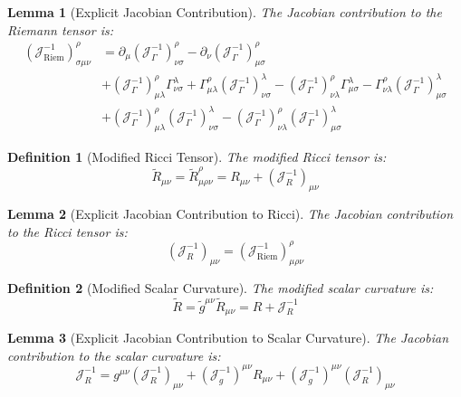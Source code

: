 \documentclass{article}
\newcommand{\tl}[1]{\tilde{#1}}
\newtheorem{lemma}{Lemma}
\newtheorem{definition}{Definition}
\begin{document}
\begin{lemma}[Explicit Jacobian Contribution]
The Jacobian contribution to the Riemann tensor is:
\begin{align}
(\mathcal{J}^{-1}_{\text{Riem}})^{\rho}_{\sigma\mu\nu} &= \partial_{\mu}(\mathcal{J}^{-1}_{\Gamma})^{\rho}_{\nu\sigma} - \partial_{\nu}(\mathcal{J}^{-1}_{\Gamma})^{\rho}_{\mu\sigma} \\
&+ (\mathcal{J}^{-1}_{\Gamma})^{\rho}_{\mu\lambda}\Gamma^{\lambda}_{\nu\sigma} + \Gamma^{\rho}_{\mu\lambda}(\mathcal{J}^{-1}_{\Gamma})^{\lambda}_{\nu\sigma} - (\mathcal{J}^{-1}_{\Gamma})^{\rho}_{\nu\lambda}\Gamma^{\lambda}_{\mu\sigma} - \Gamma^{\rho}_{\nu\lambda}(\mathcal{J}^{-1}_{\Gamma})^{\lambda}_{\mu\sigma} \\
&+ (\mathcal{J}^{-1}_{\Gamma})^{\rho}_{\mu\lambda}(\mathcal{J}^{-1}_{\Gamma})^{\lambda}_{\nu\sigma} - (\mathcal{J}^{-1}_{\Gamma})^{\rho}_{\nu\lambda}(\mathcal{J}^{-1}_{\Gamma})^{\lambda}_{\mu\sigma}
\end{align}
\end{lemma}

\begin{definition}[Modified Ricci Tensor]
The modified Ricci tensor is:
\begin{equation}
\tl{R}_{\mu\nu} = \tl{R}^{\rho}_{\mu\rho\nu} = R_{\mu\nu} + (\mathcal{J}^{-1}_R)_{\mu\nu}
\end{equation}
\end{definition}

\begin{lemma}[Explicit Jacobian Contribution to Ricci]
The Jacobian contribution to the Ricci tensor is:
\begin{equation}
(\mathcal{J}^{-1}_R)_{\mu\nu} = (\mathcal{J}^{-1}_{\text{Riem}})^{\rho}_{\mu\rho\nu}
\end{equation}
\end{lemma}

\begin{definition}[Modified Scalar Curvature]
The modified scalar curvature is:
\begin{equation}
\tl{R} = \tl{g}^{\mu\nu}\tl{R}_{\mu\nu} = R + \mathcal{J}^{-1}_R
\end{equation}
\end{definition}

\begin{lemma}[Explicit Jacobian Contribution to Scalar Curvature]
The Jacobian contribution to the scalar curvature is:
\begin{equation}
\mathcal{J}^{-1}_R = g^{\mu\nu}(\mathcal{J}^{-1}_R)_{\mu\nu} + (\mathcal{J}^{-1}_g)^{\mu\nu}R_{\mu\nu} + (\mathcal{J}^{-1}_g)^{\mu\nu}(\mathcal{J}^{-1}_R)_{\mu\nu}
\end{equation}
\end{lemma}
\end{document}
